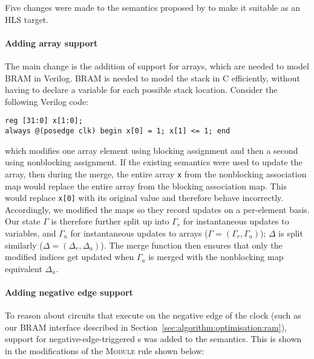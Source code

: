 Five changes were made to the semantics proposed by
\textcite{lööw19_proof_trans_veril_devel_hol} to make it suitable as an HLS
target.

\paragraph{Adding array support}
The main change is the addition of support for arrays, which are needed to model \gls{BRAM} in Verilog.  \gls{BRAM} is needed to model the stack in C efficiently, without having to declare a variable for each possible stack location. %
Consider the following Verilog code:

\begin{center}
\begin{verbatim}
reg [31:0] x[1:0];
always @(posedge clk) begin x[0] = 1; x[1] <= 1; end
\end{verbatim}
\end{center}

which modifies one array element using blocking assignment and then a second using nonblocking assignment. If the existing semantics were used to update the array, then during the merge, the entire array \texttt{x} from the nonblocking association map would replace the entire array from the blocking association map.  This would replace \texttt{x[0]} with its original value and therefore behave incorrectly. Accordingly, we modified the maps so they record updates on a per-el\-em\-ent basis. Our state $\Gamma$ is therefore further split up into $\Gamma_{r}$ for instantaneous updates to variables, and $\Gamma_{a}$ for instantaneous updates to arrays ($\Gamma = (\Gamma_{r}, \Gamma_{a})$); $\Delta$ is split similarly ($\Delta = (\Delta_{r}, \Delta_{a})$). The merge function then ensures that only the modified indices get updated when $\Gamma_{a}$ is merged with the nonblocking map equivalent $\Delta_{a}$.

\paragraph{Adding negative edge support}
To reason about circuits that execute on the negative edge of the clock (such as our \gls{BRAM} interface described in Section~\ref{sec:algorithm:optimisation:ram}),  support for negative-edge-triggered \alwaysblock{}s was added to the semantics. This is shown in the modifications of the \textsc{Module} rule shown below:

